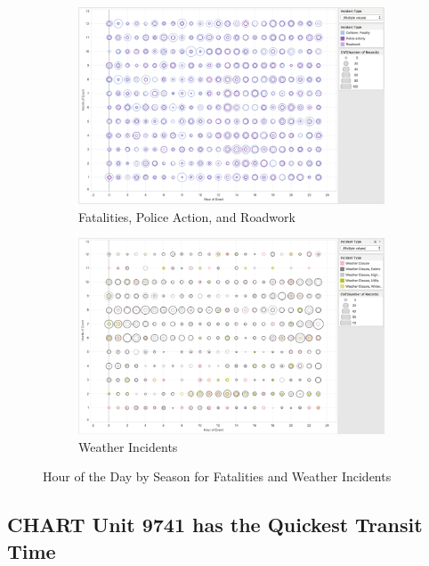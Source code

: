 \documentclass[11pt,letterpaper]{article}
\begin{document}
\begin{figure}[h]
	\centering
	\begin{subfigure}{0.49\textwidth}
		\centering
		\includegraphics[width=\textwidth]{figures/circles_death.png}
    	\caption{\textsf{Fatalities, Police Action, and Roadwork}}
	    \label{fig:circles_death}
	\end{subfigure} \hfill
	\begin{subfigure}{0.49\textwidth}
		\centering
		\includegraphics[width=\textwidth]{figures/circles_seasons.png}
		\caption{Weather Incidents}
        \label{fig:circles_seasons}
	\end{subfigure}
    \caption{\textsf{Hour of the Day by Season for Fatalities and Weather Incidents}}
    \label{fig:circles}
\end{figure}



\subsection*{CHART Unit 9741 has the Quickest Transit Time}
\end{document}
